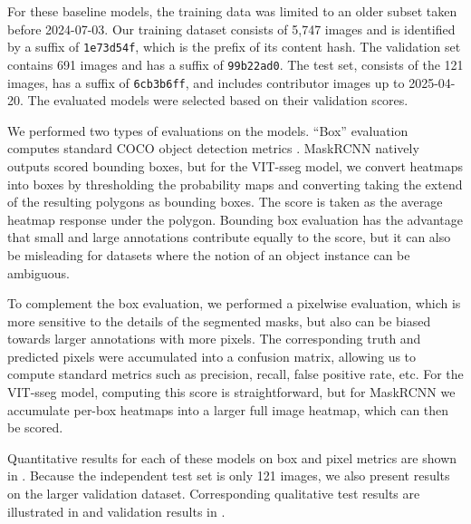 \documentclass{article}
\begin{document}
For these baseline models, the training data was limited to an older subset taken before 2024-07-03.
Our training dataset consists of 5,747 images and is identified by a suffix of {\tt 1e73d54f}, which is the
  prefix of its content hash.
The validation set contains 691 images and has a suffix of {\tt 99b22ad0}.
The test set, consists of the 121 images, has a suffix of {\tt 6cb3b6ff}, and includes contributor images
  up to 2025-04-20.
The evaluated models were selected based on their validation scores.

We performed two types of evaluations on the models.
``Box'' evaluation computes standard COCO object detection metrics \cite{lin_microsoft_2014}.
MaskRCNN natively outputs scored bounding boxes, but for the VIT-sseg model, we convert heatmaps into boxes
  by thresholding the probability maps and converting taking the extend of the resulting polygons as bounding
  boxes.
The score is taken as the average heatmap response under the polygon.
Bounding box evaluation has the advantage that small and large annotations contribute equally to the score,
  but it can also be misleading for datasets where the notion of an object instance can be ambiguous.

To complement the box evaluation, we performed a pixelwise evaluation, which is more sensitive to the
  details of the segmented masks, but also can be biased towards larger annotations with more pixels.
The corresponding truth and predicted pixels were accumulated into a confusion matrix, allowing us to
  compute standard metrics \cite{powers_evaluation_2011} such as precision, recall, false positive rate, etc.
For the VIT-sseg model, computing this score is straightforward, but for MaskRCNN we accumulate per-box
  heatmaps into a larger full image heatmap, which can then be scored.

Quantitative results for each of these models on box and pixel metrics are shown in
  .
Because the independent test set is only 121 images, we also present results on the larger validation
  dataset.
Corresponding qualitative test results are illustrated in  and validation
  results in .

\newcommand{\tb}[1]{\textbf{#1}}
\end{document}
